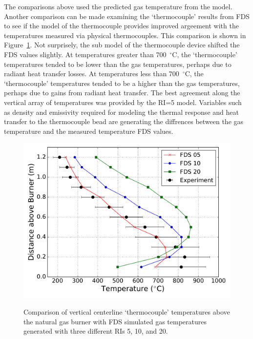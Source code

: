 \documentclass[twoside]{uocthesis}
\begin{document}
{The comparisons above used the predicted gas temperature from the model. Another comparison can be made examining the `thermocouple' results from FDS to see if the model of the thermocouple provides improved argeement with the temperatures measured via physical thermocouples.  This comparison is shown in Figure~\ref{FHNG01_RI_TC}.  Not surprisely, the sub model of the thermocouple device shifted the FDS values slightly.  At temperatures greater than 700~$^\circ$C, the `thermocouple' temperatures tended to be lower than the gas temperatures, perhaps due to radiant heat transfer losses. At temperatures less than 700~$^\circ$C, the `thermocouple' temperatures tended to be a higher than the gas temperatures, perhaps due to gains from radiant heat transfer.  The best agreement along the vertical array of temperatures was provided by the RI=5 model.  Variables such as density and emissivity required for modeling the thermal response and heat transfer to the thermocouple bead are generating the diffrences between the gas temperature and the measured temperature FDS values.  

\begin{figure}[h]
	\includegraphics[width=5in]{../Figures/FHNG01_RI_TC} \\
	\caption[Comparison of vertical centerline `thermocouple' temperatures above the natural gas burner with FDS simulated gas temperatures.]{Comparison of vertical centerline `thermocouple' temperatures above the natural gas burner with FDS simulated gas temperatures generated with three different RIs 5, 10, and 20.}
	\label{FHNG01_RI_TC}
\end{figure}

}
\end{document}
